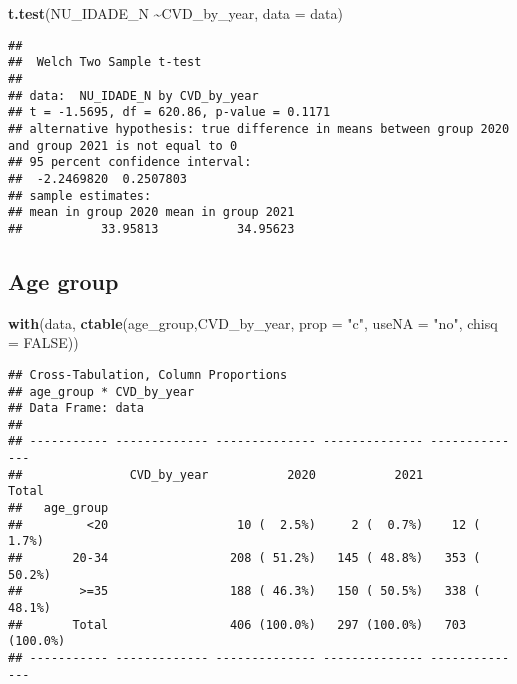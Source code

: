 \documentclass[
]{article}
\newenvironment{Shaded}{\begin{snugshade}}{\end{snugshade}}
\newcommand{\AttributeTok}[1]{\textcolor[rgb]{0.13,0.29,0.53}{#1}}
\newcommand{\ConstantTok}[1]{\textcolor[rgb]{0.56,0.35,0.01}{#1}}
\newcommand{\FunctionTok}[1]{\textcolor[rgb]{0.13,0.29,0.53}{\textbf{#1}}}
\newcommand{\NormalTok}[1]{#1}
\newcommand{\SpecialCharTok}[1]{\textcolor[rgb]{0.81,0.36,0.00}{\textbf{#1}}}
\newcommand{\StringTok}[1]{\textcolor[rgb]{0.31,0.60,0.02}{#1}}
\begin{document}
\begin{Shaded}
\begin{Highlighting}[]
\FunctionTok{t.test}\NormalTok{(NU\_IDADE\_N }\SpecialCharTok{\textasciitilde{}}\NormalTok{CVD\_by\_year, }\AttributeTok{data =}\NormalTok{ data)}
\end{Highlighting}
\end{Shaded}

\begin{verbatim}
## 
##  Welch Two Sample t-test
## 
## data:  NU_IDADE_N by CVD_by_year
## t = -1.5695, df = 620.86, p-value = 0.1171
## alternative hypothesis: true difference in means between group 2020 and group 2021 is not equal to 0
## 95 percent confidence interval:
##  -2.2469820  0.2507803
## sample estimates:
## mean in group 2020 mean in group 2021 
##           33.95813           34.95623
\end{verbatim}

\hypertarget{age-group}{%
\subsection{Age group}\label{age-group}}

\begin{Shaded}
\begin{Highlighting}[]
\FunctionTok{with}\NormalTok{(data, }\FunctionTok{ctable}\NormalTok{(age\_group,CVD\_by\_year, }\AttributeTok{prop =} \StringTok{"c"}\NormalTok{, }\AttributeTok{useNA =} \StringTok{"no"}\NormalTok{, }\AttributeTok{chisq =} \ConstantTok{FALSE}\NormalTok{))}
\end{Highlighting}
\end{Shaded}

\begin{verbatim}
## Cross-Tabulation, Column Proportions  
## age_group * CVD_by_year  
## Data Frame: data  
## 
## ----------- ------------- -------------- -------------- --------------
##               CVD_by_year           2020           2021          Total
##   age_group                                                           
##         <20                  10 (  2.5%)     2 (  0.7%)    12 (  1.7%)
##       20-34                 208 ( 51.2%)   145 ( 48.8%)   353 ( 50.2%)
##        >=35                 188 ( 46.3%)   150 ( 50.5%)   338 ( 48.1%)
##       Total                 406 (100.0%)   297 (100.0%)   703 (100.0%)
## ----------- ------------- -------------- -------------- --------------
\end{verbatim}

\begin{Shaded}
\end{Shaded}
\end{document}
